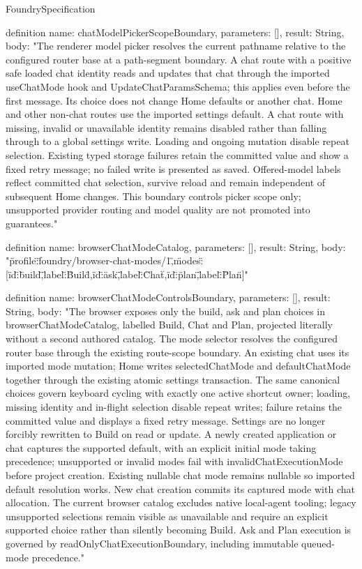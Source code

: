 \begin{lexlean}{FoundrySpecification}
\begin{semanticmodule}
definition{
  name: chatModelPickerScopeBoundary,
  parameters: [],
  result: String,
  body: "The renderer model picker resolves the current pathname relative to the configured router base at a path-segment boundary. A chat route with a positive safe loaded chat identity reads and updates that chat through the imported useChatMode hook and UpdateChatParamsSchema; this applies even before the first message. Its choice does not change Home defaults or another chat. Home and other non-chat routes use the imported settings default. A chat route with missing, invalid or unavailable identity remains disabled rather than falling through to a global settings write. Loading and ongoing mutation disable repeat selection. Existing typed storage failures retain the committed value and show a fixed retry message; no failed write is presented as saved. Offered-model labels reflect committed chat selection, survive reload and remain independent of subsequent Home changes. This boundary controls picker scope only; unsupported provider routing and model quality are not promoted into guarantees."
}

definition{
  name: browserChatModeCatalog,
  parameters: [],
  result: String,
  body: "{\"profile\":\"foundry/browser-chat-modes/1\",\"modes\":[{\"id\":\"build\",\"label\":\"Build\"},{\"id\":\"ask\",\"label\":\"Chat\"},{\"id\":\"plan\",\"label\":\"Plan\"}]}"
}

definition{
  name: browserChatModeControlsBoundary,
  parameters: [],
  result: String,
  body: "The browser exposes only the build, ask and plan choices in browserChatModeCatalog, labelled Build, Chat and Plan, projected literally without a second authored catalog. The mode selector resolves the configured router base through the existing route-scope boundary. An existing chat uses its imported mode mutation; Home writes selectedChatMode and defaultChatMode together through the existing atomic settings transaction. The same canonical choices govern keyboard cycling with exactly one active shortcut owner; loading, missing identity and in-flight selection disable repeat writes; failure retains the committed value and displays a fixed retry message. Settings are no longer forcibly rewritten to Build on read or update. A newly created application or chat captures the supported default, with an explicit initial mode taking precedence; unsupported or invalid modes fail with invalidChatExecutionMode before project creation. Existing nullable chat mode remains nullable so imported default resolution works. New chat creation commits its captured mode with chat allocation. The current browser catalog excludes native local-agent tooling; legacy unsupported selections remain visible as unavailable and require an explicit supported choice rather than silently becoming Build. Ask and Plan execution is governed by readOnlyChatExecutionBoundary, including immutable queued-mode precedence."
}


\end{semanticmodule}
\end{lexlean}
